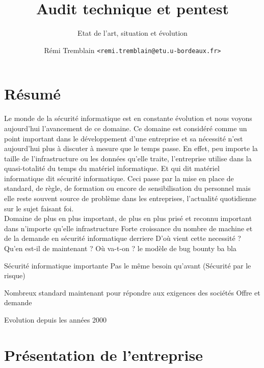 \documentclass[a4paper]{memoir}
\title{Audit technique et pentest}
\subtitle{Etat de l'art, situation et évolution}
\author{Rémi Tremblain \texttt{<remi.tremblain@etu.u-bordeaux.fr>}}
\begin{document}
\frontmatter%
\maketitle
\thispagestyle{empty}





\chapter*{Résumé}


Le monde de la sécurité informatique est en constante évolution et nous voyons aujourd'hui l'avancement de ce domaine.
Ce domaine est considéré comme un point important dans le développement d'une entreprise et sa nécessité n'est aujourd'hui plus à discuter à mesure que le temps passe. En effet, peu importe la taille de l'infrastructure ou les données qu'elle traite, l'entreprise utilise dans la quasi-totalité du temps du matériel informatique. Et qui dit matériel informatique dit sécurité informatique. Ceci passe par la mise en place de standard, de règle, de formation ou encore de sensibilisation du personnel mais elle reste souvent source de problème dans les entreprises, l'actualité quotidienne sur le sujet faisant foi.\\


Domaine de plus en plus important, de plus en plus prisé et reconnu
important dans n'importe qu'elle infrastructure 
Forte croissance du nombre de machine et de la demande en sécurité informatique derriere 
D'où vient cette necessité ? Qu'en est-il de maintenant ? Où va-t-on ? le modèle de bug bounty ba bla

Sécurité informatique importante
Pas le même besoin qu'avant (Sécurité par le risque)

Nombreux standard maintenant pour répondre aux exigences des sociétés
Offre et demande

Evolution depuis les années 2000


\chapter*{Présentation de l'entreprise}
\end{document}
